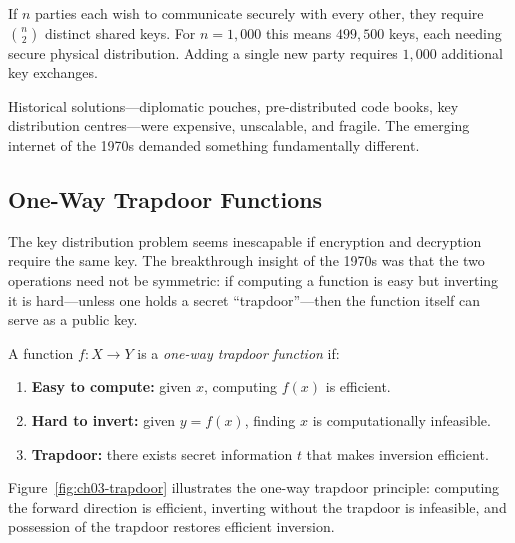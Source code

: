 \begin{example}
\label{ex:key-distribution}
If $n$ parties each wish to communicate securely with every other, they require $\binom{n}{2}$ distinct shared keys.  For $n = 1{,}000$ this means $499{,}500$ keys, each needing secure physical distribution.  Adding a single new party requires $1{,}000$ additional key exchanges.
\end{example}

Historical solutions---diplomatic pouches, pre-distributed code books, key distribution centres---were expensive, unscalable, and fragile.  The emerging internet of the 1970s demanded something fundamentally different.

\subsection{One-Way Trapdoor Functions}
\label{subsec:trapdoor}

The key distribution problem seems inescapable if encryption and decryption require the same key.  The breakthrough insight of the 1970s was that the two operations need not be symmetric: if computing a function is easy but inverting it is hard---unless one holds a secret ``trapdoor''---then the function itself can serve as a public key.

\begin{definition}
\label{def:trapdoor}
A function $f: X \to Y$ is a \emph{one-way trapdoor function} if:
\begin{enumerate}
\item \textbf{Easy to compute:} given $x$, computing $f(x)$ is efficient.
\item \textbf{Hard to invert:} given $y = f(x)$, finding $x$ is computationally infeasible.
\item \textbf{Trapdoor:} there exists secret information $t$ that makes inversion efficient.
\end{enumerate}
\end{definition}

Figure~\ref{fig:ch03-trapdoor} illustrates the one-way trapdoor principle: computing the forward direction is efficient, inverting without the trapdoor is infeasible, and possession of the trapdoor restores efficient inversion.

